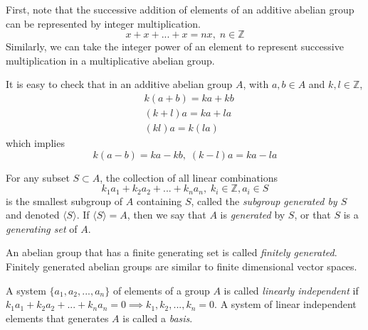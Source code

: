 \documentclass{article}
\begin{document}
    First, note that the successive addition of elements of an additive abelian group can be represented by integer multiplication. 
    \begin{equation}
      x + x + ... + x = n x, \; n \in \mathbb{Z}
    \end{equation}
    Similarly, we can take the integer power of an element to represent successive multiplication in a multiplicative abelian group. 

    \begin{proposition}
      It is easy to check that in an additive abelian group $A$, with $a, b \in A$ and $k, l \in \mathbb{Z}$, 
      \begin{align}
        & k (a + b) = k a + k b \\
        & (k + l) a = k a + l a \\
        & (k l) a = k (l a)
      \end{align}
      which implies
      \begin{equation}
        k(a - b) = k a - k b, \; (k - l) a = k a - l a
      \end{equation}
    \end{proposition}

    \begin{definition}
      For any subset $S \subset A$, the collection of all linear combinations 
      \begin{equation}
        k_1 a_1 + k_2 a_2 + ... + k_n a_n, \; k_i \in \mathbb{Z}, a_i \in S
      \end{equation}
      is the smallest subgroup of $A$ containing $S$, called the \textit{subgroup generated by $S$} and denoted $\langle S \rangle$. If $\langle S \rangle = A$, then we say that $A$ is \textit{generated} by $S$, or that $S$ is a \textit{generating set} of $A$. 
    \end{definition}

    \begin{definition}
      An abelian group that has a finite generating set is called \textit{finitely generated}. Finitely generated abelian groups are similar to finite dimensional vector spaces. 
    \end{definition}

    \begin{definition}
      A system $\{ a_1, a_2, ..., a_n\}$ of elements of a group $A$ is called \textit{linearly independent} if $k_1 a_1 + k_2 a_2 + ... + k_n a_n = 0 \implies k_1, k_2, ..., k_n = 0$. A system of linear independent elements that generates $A$ is called a \textit{basis}. 
    \end{definition}
\end{document}
